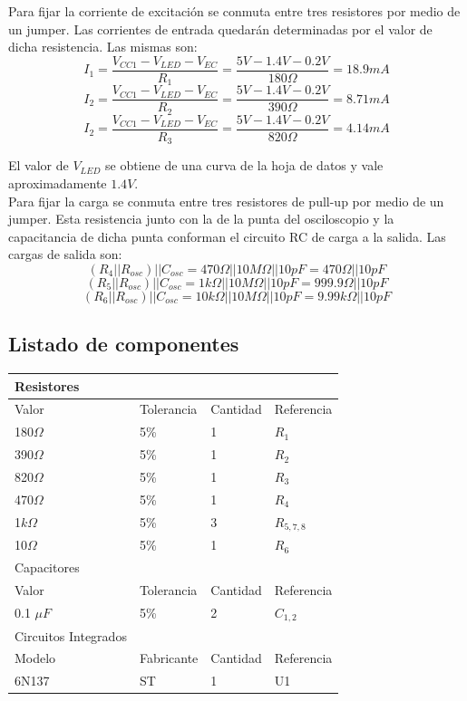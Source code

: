 \documentclass[12pt,a4paper]{article}
\begin{document}
Para fijar la corriente de excitación se conmuta entre tres resistores por medio de un jumper. Las corrientes de entrada quedarán determinadas por el valor de dicha resistencia. Las mismas son:
$$
I_1=\frac{V_{CC1}-V_{LED}-V_{EC}}{R_1}=\frac{5V-1.4V-0.2V}{180\Omega}=18.9mA
$$
$$
I_2=\frac{V_{CC1}-V_{LED}-V_{EC}}{R_2}=\frac{5V-1.4V-0.2V}{390\Omega}=8.71mA
$$
$$
I_2=\frac{V_{CC1}-V_{LED}-V_{EC}}{R_3}=\frac{5V-1.4V-0.2V}
{820\Omega}=4.14mA
$$

El valor de $V_{LED}$ se obtiene de una curva de la hoja de datos y vale aproximadamente $1.4V$.\\
Para fijar la carga se conmuta entre tres resistores de pull-up por medio de un jumper. Esta resistencia junto con la de la punta del osciloscopio y la capacitancia de dicha punta conforman el circuito RC de carga a la salida.
Las cargas de salida son:
$$
(R_4||R_{osc})||C_{osc}=470\Omega ||10M\Omega || 10pF =470\Omega || 10pF
$$
$$
(R_5||R_{osc})||C_{osc}=1k\Omega ||10M\Omega || 10pF =999.9\Omega || 10pF
$$
$$
(R_6||R_{osc})||C_{osc}=10k\Omega ||10M\Omega || 10pF =9.99k\Omega || 10pF
$$

\newpage
\subsection{Listado de componentes}

\begin{tabular}{| l | l | l | l |}
\hline
Resistores & & &\\ \hline
Valor & Tolerancia & Cantidad & Referencia\\ \hline
180$\Omega$ & 5\% & 1 & $R_1$\\ \hline
390$\Omega$ & 5\% & 1 & $R_2$\\ \hline
820$\Omega$ & 5\% & 1 & $R_3$\\ \hline
470$\Omega$ & 5\% & 1 & $R_4$\\ \hline
1$k\Omega$ & 5\% & 3 & $R_{5,7,8}$\\ \hline
10$\Omega$ & 5\% & 1 & $R_6$\\ \hline
Capacitores & & & \\ \hline
Valor & Tolerancia & Cantidad & Referencia \\ \hline
0.1 $\mu F$ & 5\% & 2 & $C_{1,2}$  \\ \hline
Circuitos Integrados& & &\\ \hline
Modelo & Fabricante & Cantidad & Referencia \\ \hline
6N137 & ST & 1 & U1 \\ \hline
\end{tabular}
\end{document}

